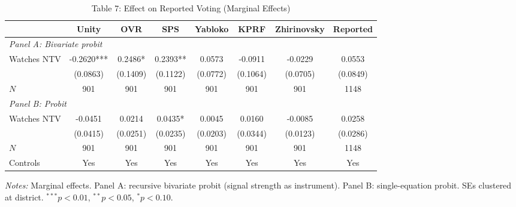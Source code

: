 \begin{table}[htbp]
\centering
\caption{Table 7: Effect on Reported Voting (Marginal Effects)}
\label{tab:enik_table7}
\begin{adjustbox}{max width=\textwidth}
\begin{tabular}{lccccccc}
\toprule
 & Unity & OVR & SPS & Yabloko & KPRF & Zhirinovsky & Reported \\
\midrule
\multicolumn{8}{l}{\textit{Panel A: Bivariate probit}} \\
Watches NTV & -0.2620*** & 0.2486* & 0.2393** & 0.0573 & -0.0911 & -0.0229 & 0.0553 \\
 & (0.0863) & (0.1409) & (0.1122) & (0.0772) & (0.1064) & (0.0705) & (0.0849) \\
$N$ & 901 & 901 & 901 & 901 & 901 & 901 & 1148 \\
\midrule
\multicolumn{8}{l}{\textit{Panel B: Probit}} \\
Watches NTV & -0.0451 & 0.0214 & 0.0435* & 0.0045 & 0.0160 & -0.0085 & 0.0258 \\
 & (0.0415) & (0.0251) & (0.0235) & (0.0203) & (0.0344) & (0.0123) & (0.0286) \\
$N$ & 901 & 901 & 901 & 901 & 901 & 901 & 1148 \\
\midrule
Controls & Yes & Yes & Yes & Yes & Yes & Yes & Yes \\
\bottomrule
\end{tabular}
\end{adjustbox}
\parbox{\textwidth}{\footnotesize\textit{Notes:} Marginal effects. Panel A: recursive bivariate probit (signal strength as instrument). Panel B: single-equation probit. SEs clustered at district. $^{***}p<0.01$, $^{**}p<0.05$, $^{*}p<0.10$.}
\end{table}
